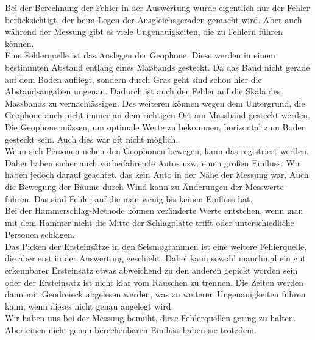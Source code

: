 Bei der Berechnung der Fehler in der Auswertung wurde eigentlich nur der Fehler berücksichtigt, der beim Legen der Ausgleichsgeraden gemacht wird. Aber auch während der Messung gibt es viele Ungenauigkeiten, die zu Fehlern führen können. \\
Eine Fehlerquelle ist das Auslegen der Geophone. Diese werden in einem bestimmten Abstand entlang eines Maßbands gesteckt. Da das Band nicht gerade auf dem Boden aufliegt, sondern durch Gras geht sind schon hier die Abstandsangaben ungenau. Dadurch ist auch der Fehler auf die Skala des Massbands zu vernachlässigen. Des weiteren können wegen dem Untergrund, die Geophone auch nicht immer an dem richtigen Ort am Massband gesteckt werden. Die Geophone müssen, um optimale Werte zu bekommen, horizontal zum Boden gesteckt sein. Auch dies war oft nicht möglich.\\
Wenn sich Personen neben den Geophonen bewegen, kann das registriert werden. Daher haben sicher auch vorbeifahrende Autos usw. einen großen Einfluss. Wir haben jedoch darauf geachtet, das kein Auto in der Nähe der Messung war. Auch die Bewegung der Bäume durch Wind kann zu Änderungen der Messwerte führen. Das sind Fehler auf die man wenig bis keinen Einfluss hat. \\
Bei der Hammerschlag-Methode können veränderte Werte entstehen, wenn man mit dem Hammer nicht die Mitte der Schlagplatte trifft oder unterschiedliche Personen schlagen. \\
Das Picken der Ersteinsätze in den Seismogrammen ist eine weitere Fehlerquelle, die aber erst in der Auswertung geschieht. Dabei kann sowohl manchmal ein gut erkennbarer Ersteinsatz etwas abweichend zu den anderen gepickt worden sein oder der Ersteinsatz ist nicht klar vom Rauschen zu trennen. Die Zeiten werden dann mit Geodreieck abgelesen werden, was zu weiteren Ungenauigkeiten führen kann, wenn dieses nicht genau angelegt wird. \\
Wir haben uns bei der Messung bemüht, diese Fehlerquellen gering zu halten. Aber einen nicht genau berechenbaren Einfluss haben sie trotzdem.